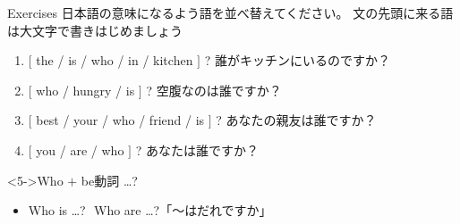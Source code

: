 \documentclass[aspectratio=169]{beamer}
\begin{document}
\begin{frame}[plain]{Exercises}
日本語の意味になるよう語を並べ替えてください。
文の先頭に来る語は大文字で書きはじめましょう\mbox{}\hfill{}

 \begin{enumerate}
  \item  $[$ the / is / who / in / kitchen $]$ ? 誰がキッチンにいるのですか？\\
  \item  $[$ who / hungry / is $]$ ? 空腹なのは誰ですか？\\
  \item  $[$ best / your / who / friend / is $]$ ? あなたの親友は誰ですか？\\
  \item  $[$ you / are / who $]$ ? あなたは誰ですか？\\
\end{enumerate}

\begin{block}<5->{Who $+$ be動詞 \ldots ?}
 \begin{itemize}[square]
  \item Who is \ldots{}?\,\, Who are \ldots{}?\hfill{}「～はだれですか」
 \end{itemize}
\end{block}
\end{frame}
\end{document}
